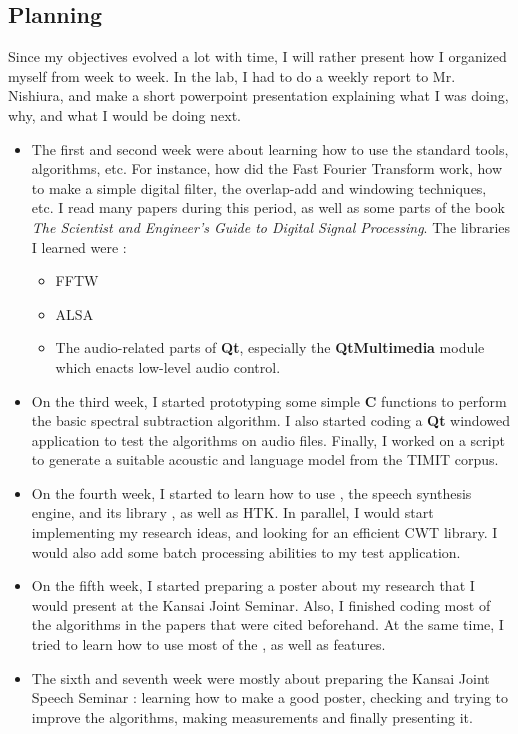 \subsection{Planning}
Since my objectives evolved a lot with time, I will rather present how I organized myself from week to week.
In the lab, I had to do a weekly report to Mr. Nishiura, and make a short powerpoint presentation explaining what I was doing, why, and what I would be doing next.

\begin{itemize}
\item The first and second week were about learning how to use the standard tools, algorithms, etc. For instance, how did the Fast Fourier Transform work, how to make a simple digital filter, the overlap-add and windowing techniques, etc. I read many papers during this period, as well as some parts of the book \textit{The Scientist and Engineer's Guide to Digital Signal Processing}. The libraries I learned were : 
\begin{itemize}
\item \ac{FFTW}
\item \ac{ALSA}
\item The audio-related parts of \textbf{Qt}, especially the \textbf{QtMultimedia} module which enacts low-level audio control.
\end{itemize}
\item On the third week, I started prototyping some simple \textbf{C} functions to perform the basic spectral subtraction algorithm. I also started coding a \textbf{Qt} windowed application to test the algorithms on audio files. Finally, I worked on a script to generate a suitable acoustic and language model from the \ac{TIMIT} corpus.
\item On the fourth week, I started to learn how to use , the speech synthesis engine, and its library , as well as \ac{HTK}. In parallel, I would start implementing my research ideas, and looking for an efficient \ac{CWT} library. I would also add some batch processing abilities to my test application.
\item On the fifth week, I started preparing a poster about my research that I would present at the Kansai Joint Seminar. Also, I finished coding most of the algorithms in the papers that were cited beforehand. At the same time, I tried to learn how to use most of the  , as well as  features.
\item The sixth and seventh week were mostly about preparing the Kansai Joint Speech Seminar : learning how to make a good poster, checking and trying to improve the algorithms, making measurements and finally presenting it.

\end{itemize}

